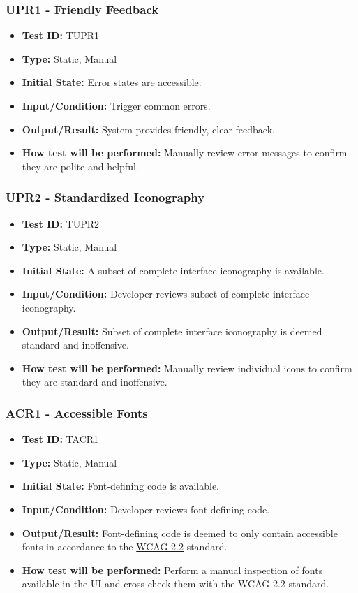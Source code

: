 \documentclass[12pt, titlepage]{article}
\begin{document}
\subsubsection{UPR1 - Friendly Feedback}
\begin{itemize}
    \item \textbf{Test ID:} TUPR1
    \item \textbf{Type:} Static, Manual
    \item \textbf{Initial State:} Error states are accessible.
    \item \textbf{Input/Condition:} Trigger common errors.
    \item \textbf{Output/Result:} System provides friendly, clear feedback.
    \item \textbf{How test will be performed:} Manually review error messages to confirm they are polite and helpful.
\end{itemize}

\subsubsection{UPR2 - Standardized Iconography}
\begin{itemize}
    \item \textbf{Test ID:} TUPR2
    \item \textbf{Type:} Static, Manual
    \item \textbf{Initial State:} A subset of complete interface iconography is available.
    \item \textbf{Input/Condition:} Developer reviews subset of complete interface iconography.
    \item \textbf{Output/Result:} Subset of complete interface iconography is deemed standard and inoffensive.
    \item \textbf{How test will be performed:} Manually review individual icons to confirm they are standard and inoffensive.
\end{itemize}

\subsubsection{ACR1 - Accessible Fonts}
\begin{itemize}
    \item \textbf{Test ID:} TACR1
    \item \textbf{Type:} Static, Manual
    \item \textbf{Initial State:} Font-defining code is available.
    \item \textbf{Input/Condition:} Developer reviews font-defining code.
    \item \textbf{Output/Result:} Font-defining code is deemed to only contain accessible fonts in accordance to the \href{https://www.w3.org/TR/2023/REC-WCAG22-20231005/}{WCAG 2.2} standard.
    \item \textbf{How test will be performed:} Perform a manual inspection of fonts available in the UI and cross-check them with the WCAG 2.2 standard.
\end{itemize}
\end{document}
